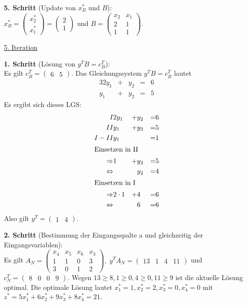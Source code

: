 \documentclass[10pt,a4paper,oneside,ngerman,numbers=noenddot]{scrartcl}
\begin{document}
		\textbf{5. Schritt} (Update von $x_{B}^{*}$ und $B$):\\
		$x_{B}^{*} = \begin{pmatrix} x_{2}^{*} \\ x_{1}^{*} \end{pmatrix} = \begin{pmatrix} 2 \\ 1 \end{pmatrix}$ und $B = \begin{pmatrix} x_{2} & x_{1} \\ 2 & 1 \\ 1 & 1 \end{pmatrix}$.
		
		\underline{5. Iteration}
		
		\textbf{1. Schritt} (Lösung von $y^{T}B = c_{B}^{T}$):\\
		Es gilt $c_{B}^{T} = \begin{pmatrix} 6 & 5 \end{pmatrix}$. Das Gleichungssystem $y^{T}B = c_{B}^{T}$ lautet
		\begin{alignat*}{3}
			2y_{1} &+& y_{2} &=& 6 \\
			y_{1} &+& y_{2} &=& 5
		\end{alignat*}
		Es ergibt sich dieses LGS:
		\begin{alignat*}{3}
			I & 2y_{1} &+& y_{2} &=& 6 \\
			II & y_{1} &+& y_{2} &=& 5 \\
			I - II & y_{1} && &=& 1 \\
			\intertext{Einsetzen in II}
			\Rightarrow & 1 &+& y_{2} &=& 5 \\
			\Leftrightarrow & && y_{2} &=& 4 \\
			\intertext{Einsetzen in I}
			\Rightarrow & 2 \cdot 1 &+& 4 &=& 6 \\
			\Leftrightarrow & && 6 &=& 6
		\end{alignat*}
		Also gilt $y^{T} = \begin{pmatrix} 1 & 4 \end{pmatrix}$.
		
		\textbf{2. Schritt} (Bestimmung der Eingangsspalte a und gleichzeitig der Eingangsvariablen):\\
		Es gilt $A_{N} = \begin{pmatrix} x_{4} & x_{5} & x_{6} & x_{3} \\ 1 & 1 & 0 & 3 \\ 3 & 0 & 1 & 2 \end{pmatrix},\; y^{T}A_{N} = \begin{pmatrix} 13 & 1 & 4 & 11 \end{pmatrix}$ und $c_{N}^{T} = \begin{pmatrix} 8 & 0 & 0 & 9\end{pmatrix}$.  Wegen $13 \geq 8, 1 \geq 0, 4 \geq 0, 11 \geq 9$ ist die aktuelle Lösung optimal. Die optimale Lösung lautet $x_{1}^{*} = 1, x_{2}^{*} = 2, x_{3}^{*} = 0, x_{4}^{*} = 0$ mit $z^{*} = 5x_{1}^{*} + 6x_{2}^{*} + 9x_{3}^{*} + 8x_{4}^{*} = 21$.
\end{document}
